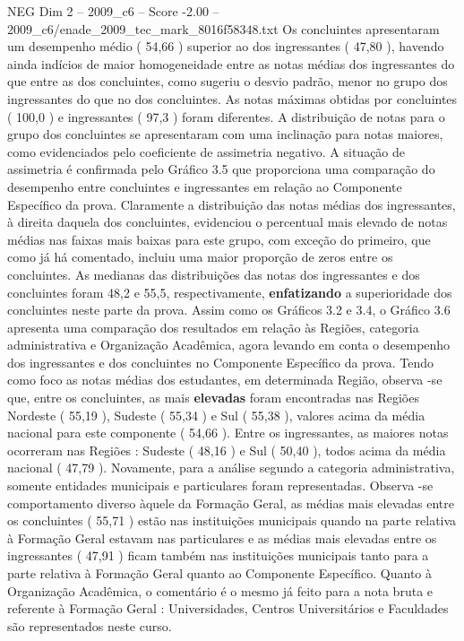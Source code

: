 \begin{textsample}{NEG Dim 2 – 2009\_c6 – Score -2.00 – 2009\_c6/enade\_2009\_tec\_mark\_8016f58348.txt}
Os concluintes apresentaram um desempenho médio ( 54,66 ) superior ao dos ingressantes ( 47,80 ), havendo ainda indícios de maior homogeneidade entre as notas médias dos ingressantes do que entre as dos concluintes, como sugeriu o desvio padrão, menor no grupo dos ingressantes do que no dos concluintes.
As notas máximas obtidas por concluintes ( 100,0 ) e ingressantes ( 97,3 ) foram diferentes.
A distribuição de notas para o grupo dos concluintes se apresentaram com uma inclinação para notas maiores, como evidenciados pelo coeficiente de assimetria negativo.
A situação de assimetria é confirmada pelo Gráfico 3.5 que proporciona uma comparação do desempenho entre concluintes e ingressantes em relação ao Componente Específico da prova.
Claramente a distribuição das notas médias dos ingressantes, à direita daquela dos concluintes, evidenciou o percentual mais elevado de notas médias nas faixas mais baixas para este grupo, com exceção do primeiro, que como já há comentado, incluiu uma maior proporção de zeros entre os concluintes.
As medianas das distribuições das notas dos ingressantes e dos concluintes foram 48,2 e 55,5, respectivamente, \textbf{enfatizando} a superioridade dos concluintes neste parte da prova.
Assim como os Gráficos 3.2 e 3.4, o Gráfico 3.6 apresenta uma comparação dos resultados em relação às Regiões, categoria administrativa e Organização Acadêmica, agora levando em conta o desempenho dos ingressantes e dos concluintes no Componente Específico da prova.
Tendo como foco as notas médias dos estudantes, em determinada Região, observa -se que, entre os concluintes, as mais \textbf{elevadas} foram encontradas nas Regiões Nordeste ( 55,19 ), Sudeste ( 55,34 ) e Sul ( 55,38 ), valores acima da média nacional para este componente ( 54,66 ).
Entre os ingressantes, as maiores notas ocorreram nas Regiões : Sudeste ( 48,16 ) e Sul ( 50,40 ), todos acima da média nacional ( 47,79 ).
Novamente, para a análise segundo a categoria administrativa, somente entidades municipais e particulares foram representadas.
Observa -se comportamento diverso àquele da Formação Geral, as médias mais elevadas entre os concluintes ( 55,71 ) estão nas instituições municipais quando na parte relativa à Formação Geral estavam nas particulares e as médias mais elevadas entre os ingressantes ( 47,91 ) ficam também nas instituições municipais tanto para a parte relativa à Formação Geral quanto ao Componente Específico.
Quanto à Organização Acadêmica, o comentário é o mesmo já feito para a nota bruta e referente à Formação Geral : Universidades, Centros Universitários e Faculdades são representados neste curso.

\end{textsample}
